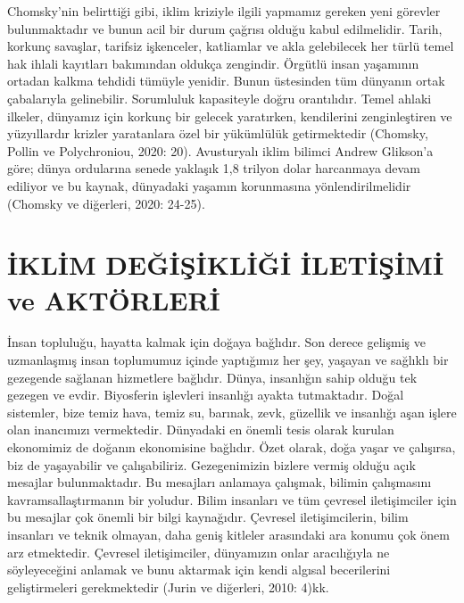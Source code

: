 \documentclass[
]{book}
\begin{document}
Chomsky'nin belirttiği gibi, iklim kriziyle ilgili yapmamız gereken yeni görevler bulunmaktadır ve bunun acil bir durum çağrısı olduğu kabul edilmelidir. Tarih, korkunç savaşlar, tarifsiz işkenceler, katliamlar ve akla gelebilecek her türlü temel hak ihlali kayıtları bakımından oldukça zengindir. Örgütlü insan yaşamının ortadan kalkma tehdidi tümüyle yenidir. Bunun üstesinden tüm dünyanın ortak çabalarıyla gelinebilir. Sorumluluk kapasiteyle doğru orantılıdır. Temel ahlaki ilkeler, dünyamız için korkunç bir gelecek yaratırken, kendilerini zenginleştiren ve yüzyıllardır krizler yaratanlara özel bir yükümlülük getirmektedir (Chomsky, Pollin ve Polychroniou, 2020: 20). Avusturyalı iklim bilimci Andrew Glikson'a göre; dünya ordularına senede yaklaşık 1,8 trilyon dolar harcanmaya devam ediliyor ve bu kaynak, dünyadaki yaşamın korunmasına yönlendirilmelidir (Chomsky ve diğerleri, 2020: 24-25).

\hypertarget{iklim-deux11fiux15fikliux11fi-iletiux15fimi-ve-aktuxf6rleri}{%
\chapter{İKLİM DEĞİŞİKLİĞİ İLETİŞİMİ ve AKTÖRLERİ}\label{iklim-deux11fiux15fikliux11fi-iletiux15fimi-ve-aktuxf6rleri}}

İnsan topluluğu, hayatta kalmak için doğaya bağlıdır. Son derece gelişmiş ve uzmanlaşmış insan toplumumuz içinde yaptığımız her şey, yaşayan ve sağlıklı bir gezegende sağlanan hizmetlere bağlıdır. Dünya, insanlığın sahip olduğu tek gezegen ve evdir. Biyosferin işlevleri insanlığı ayakta tutmaktadır. Doğal sistemler, bize temiz hava, temiz su, barınak, zevk, güzellik ve insanlığı aşan işlere olan inancımızı vermektedir. Dünyadaki en önemli tesis olarak kurulan ekonomimiz de doğanın ekonomisine bağlıdır. Özet olarak, doğa yaşar ve çalışırsa, biz de yaşayabilir ve çalışabiliriz. Gezegenimizin bizlere vermiş olduğu açık mesajlar bulunmaktadır. Bu mesajları anlamaya çalışmak, bilimin çalışmasını kavramsallaştırmanın bir yoludur. Bilim insanları ve tüm çevresel iletişimciler için bu mesajlar çok önemli bir bilgi kaynağıdır. Çevresel iletişimcilerin, bilim insanları ve teknik olmayan, daha geniş kitleler arasındaki ara konumu çok önem arz etmektedir. Çevresel iletişimciler, dünyamızın onlar aracılığıyla ne söyleyeceğini anlamak ve bunu aktarmak için kendi algısal becerilerini geliştirmeleri gerekmektedir (Jurin ve diğerleri, 2010: 4)kk.
\end{document}
